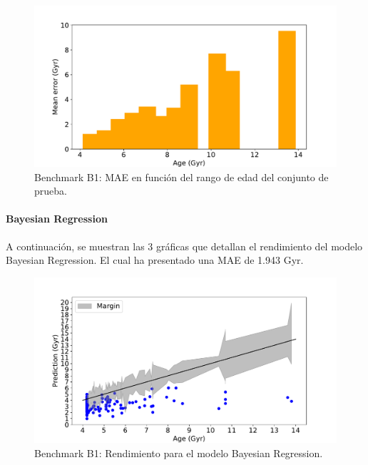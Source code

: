 \begin{figure}[H]
\begin{center}
 \includegraphics[width=0.8\linewidth]{Figuras/Experimentos/B_B1_lr_3.pdf}
\end{center}
\caption{Benchmark B1: MAE en función del rango de edad del conjunto de prueba.}
 \label{fig:benchB1_details_lr_3}
\end{figure}

\paragraph{Bayesian Regression} 
A continuación, se muestran las 3 gráficas que detallan el rendimiento del modelo Bayesian Regression. El cual ha presentado una MAE de 1.943 Gyr.
\begin{figure}[H]
\begin{center}
 \includegraphics[width=0.8\linewidth]{Figuras/Experimentos/B_B1_bayes_1.pdf}
\end{center}
\caption{Benchmark B1: Rendimiento para el modelo Bayesian Regression.}
 \label{fig:benchB1_details_bayes_1}
\end{figure}

